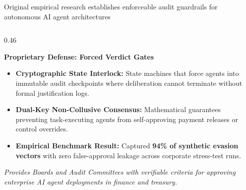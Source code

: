 \documentclass[aspectratio=169, 8pt]{beamer}
\begin{document}
\begin{frame}{Original empirical research establishes enforceable audit guardrails for autonomous AI agent architectures}
\begin{columns}[T]
        \begin{column}{0.46\textwidth}
            \begin{tcolorbox}[colback=cardBg, colframe=cardBorder, arc=1pt, boxrule=0.6pt, left=4pt, right=4pt, top=3pt, bottom=3pt]
                \textbf{\normalsize \color{terracotta} Proprietary Defense: Forced Verdict Gates}
            \end{tcolorbox}
            \vspace{0.1cm}
            \begin{itemize}
                \setlength{\itemsep}{2.5pt}
                \item \textbf{Cryptographic State Interlock:} State machines that force agents into immutable audit checkpoints where deliberation cannot terminate without formal justification logs.
                \item \textbf{Dual-Key Non-Collusive Consensus:} Mathematical guarantees preventing task-executing agents from self-approving payment releases or control overrides.
                \item \textbf{Empirical Benchmark Result:} Captured \textbf{94\% of synthetic evasion vectors} with zero false-approval leakage across corporate stress-test runs.
            \end{itemize}
            
            \vspace{0.15cm}
            \begin{tcolorbox}[colback=cardBg, colframe=terracotta!30, arc=1pt, boxrule=0.5pt, left=3pt, right=3pt, top=2pt, bottom=2pt]
                \scriptsize \textit{Provides Boards and Audit Committees with verifiable criteria for approving enterprise AI agent deployments in finance and treasury.}
            \end{tcolorbox}
        \end{column}
    \end{columns}
\end{frame}
\end{document}
